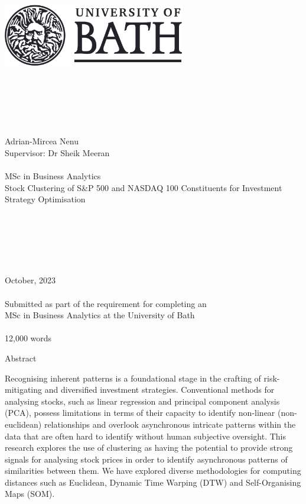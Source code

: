 \documentclass[11pt]{article}
\author{Adrian Mircea Nenu}
\begin{document}
\begin{center}
    ~\\ 
    \includegraphics[width=8cm]{img/bath.jpg} 
 
    ~\\  
    ~\\ 
    ~\\ 
    ~\\ 
    ~\\ 
    \small Adrian-Mircea Nenu
    ~\\ 
    \small Supervisor: Dr Sheik Meeran
    ~\\ 
    ~\\ 
    \large MSc in Business Analytics
    ~\\ 
    \Huge Stock Clustering of S\&P 500 and NASDAQ 100 Constituents for Investment Strategy Optimisation  
    ~\\ 
    ~\\ 
    ~\\ 
    ~\\    
            ~\\    
    ~\\    
    ~\\    
    \Large October, 2023
    ~\\    
    ~\\    
    \large Submitted as part of the requirement for completing an \\
    MSc in Business Analytics at the University of Bath
    ~\\    
    ~\\    
    \small 12,000 words
\end{center}

\thispagestyle{empty}

\newpage


\begin{center} {\LARGE Abstract} \end{center}

Recognising inherent patterns is a foundational stage in the crafting of risk-mitigating and diversified investment strategies. Conventional methods for analysing stocks, such as linear regression and principal component analysis (PCA), possess limitations in terms of their capacity to identify non-linear (non-euclidean) relationships and overlook asynchronous intricate patterns within the data that are often hard to identify without human subjective oversight. This research explores the use of clustering as having the potential to provide strong signals for analysing stock prices in order to identify asynchronous patterns of similarities between them. We have explored diverse methodologies for computing distances such as Euclidean, Dynamic Time Warping (DTW) and Self-Organising Maps (SOM).
\end{document}
